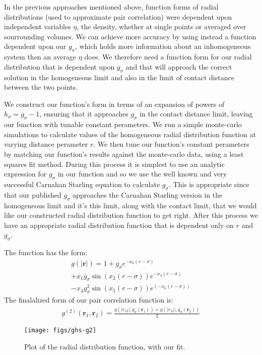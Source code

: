 \documentclass[letterpaper,twocolumn,amsmath,amssymb,pre,aps,10pt]{revtex4-1}
\newcommand{\rr}{\textbf{r}}
\begin{document}
In the previous approaches mentioned above, function forms of radial
distributions (used to approximate pair correlation) were dependent
upon independent variables $\eta$, the density, whether at single
points or averaged over sourrounding volumes.  We can achieve more
accuracy by using instead a function dependent upon our $g_{\sigma}$,
which holds more information about an inhomogeneous system
then an average $\eta$ does.  We therefore need a function form for
our radial distribution that is dependent upon $g_{\sigma}$ and that
will approach the correct solution in the homogeneous limit and also
in the limit of contact distance between the two points.

We construct our function's form in terms of an expansion of powers of
$h_{\sigma} = g_{\sigma}-1$, ensuring that it approaches $g_{\sigma}$
in the contact distance limit, leaving our function with tunable
constant perameters.  We run a simple monte-carlo simulations to
calculate values of the homogeneous radial distribution function at
varying distance perameter $r$.  We then tune our function's constant
perameters by matching our function's results against the monte-carlo
data, using a least squares fit method.  During this process it is
simplest to use an analytic expression for $g_{\sigma}$ in our
function and so we use the well known and very successful Carnahan
Starling equation to calculate $g_{\sigma}$.  This is appropriate
since that our published $g_{\sigma}$ approaches the Carnahan Starling
version in the homogeneous limit and it's this limit, along with the
contact limit, that we would like our constructed radial distribution
function to get right.  After this process we have an appropriate
radial distribution function that is dependent only on $r$ and
$g_{\sigma}$.

The function has the form:
\begin{multline}
  g(|\rr|) = 1 + g_{\sigma}e^{-x_0(r-\sigma)} \\+ x_1g_{\sigma}\sin(x_2(r-\sigma))e^{-x_3(r-\sigma)}\\
  -x_4g_{\sigma}^2\sin(x_5(r-\sigma))e^(-x_6(r-\sigma))
\end{multline}
The finalalized form of our pair correlation function is:
\begin{align}
  g^{(2)}(\rr_1,\rr_2) = \frac{g(|r_{12}|, g_\sigma(\rr_1)) + g(|r_{12}|, g_\sigma(\rr_2))}{2}
\end{align}

\begin{figure}
  \centering
  \texttt{[image: figs/ghs-g2]}%
  \caption{Plot of the radial distribution function, with our fit.}\label{fig:radial-distribution}
\end{figure}
\end{document}
